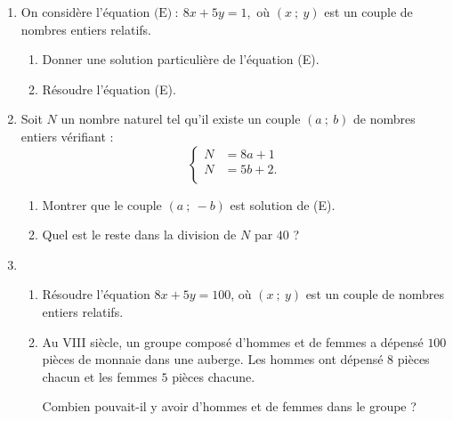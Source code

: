 \documentclass{cornouaille}
\begin{document}
\begin{exercice}
\begin{enumerate}
\item On considère l'équation $\text{(E)}~:~8x + 5y = 1$,~où $(x~;~y)$ est un couple de nombres entiers relatifs. 
\begin{enumerate}
\item Donner une solution particulière de l'équation (E). 
\item Résoudre l'équation (E). 
\end{enumerate} 

\item Soit $N$ un nombre naturel tel qu'il existe un couple $(a~;~b)$ de 
nombres entiers vérifiant : 
$$\left\{\begin{aligned} 
N&=8a + 1\\ 
N&=5b + 2.\\ 
\end{aligned}\right.$$ 

\begin{enumerate} 
\item Montrer que le couple $(a~;~-b)$ est solution de (E). 
\item Quel est le reste dans la division de $N$ par $40$ ? 
\end{enumerate} 

\item \begin{enumerate}
\item Résoudre l'équation $8x + 5 y = 100$, où $(x~;~ y)$ est un couple de  nombres entiers relatifs. 

\item Au VIII\ieme{} siècle, un groupe composé d'hommes et de femmes a  dépensé $100$ pièces de monnaie dans une auberge. Les hommes ont dépensé $8$ pièces 
chacun et les femmes $5$ pièces chacune. 

Combien pouvait-il y avoir d'hommes et de femmes dans le groupe ? 
\end{enumerate} 
\end{enumerate}
\end{exercice}



%





\end{document}

